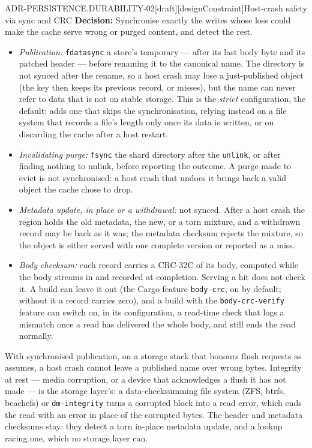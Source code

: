 \begin{requirement}{ADR-PERSISTENCE.DURABILITY-02}[draft][designConstraint]{Host-crash safety via sync and CRC}
  \textbf{Decision:} Synchronise exactly the writes whose loss could make the
  cache serve wrong or purged content, and detect the rest.
  \begin{itemize}
    \item \emph{Publication:} \texttt{fdatasync} a store's temporary ---
      after its last body byte and its patched header --- before renaming it
      to the canonical name. The directory is not synced after the rename,
      so a host crash may lose a just-published object (the key then keeps
      its previous record, or misses), but the name can never refer to
      data that is not on stable storage. This is the \emph{strict}
      configuration, the default: 
      adds one that skips the synchronisation, relying instead on a file
      system that records a file's length only once its data is written,
      or on discarding the cache after a host restart.
    \item \emph{Invalidating purge:} \texttt{fsync} the shard directory
      after the \texttt{unlink}, or after finding nothing to unlink, before
      reporting the outcome. A purge made to evict is not synchronised: a
      host crash that undoes it brings back a valid object the cache chose
      to drop.
    \item \emph{Metadata update, in place or a withdrawal:} not synced.
      After a host crash the region holds the old metadata, the new, or a
      torn mixture, and a withdrawn record may be back as it was; the
      metadata checksum rejects the mixture, so the object is either served
      with one complete version or reported as a miss.
    \item \emph{Body checksum:} each record carries a CRC-32C of its body,
      computed while the body streams in and recorded at completion. Serving
      a hit does not check it. A build can leave it out (the Cargo feature
      \texttt{body-crc}, on by default; without it a record carries zero),
      and a build with the \texttt{body-crc-verify} feature can switch on, in
      its configuration, a read-time check that logs a mismatch once a read
      has delivered the whole body, and still ends the read normally.
  \end{itemize}
  With synchronised publication, on a storage stack that honours flush
  requests as  assumes, a host crash
  cannot leave a published name over wrong bytes. Integrity at rest --- media
  corruption, or a device that acknowledges a flush it has not made --- is
  the storage layer's: a data-checksumming file system (ZFS, btrfs,
  bcachefs) or \texttt{dm-integrity} turns a corrupted block into a read
  error, which ends the read with an error in place of the corrupted bytes.
  The header and metadata checksums stay: they detect a torn in-place
  metadata update, and a lookup racing one, which no storage layer can.


\end{requirement}
